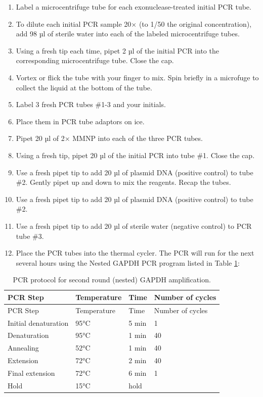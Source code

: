 \documentclass[]{book}
\providecommand{\tightlist}{%
  \setlength{\itemsep}{0pt}\setlength{\parskip}{0pt}}
\theoremstyle{definition}
\theoremstyle{definition}
\theoremstyle{definition}
\theoremstyle{remark}
\begin{document}
\begin{enumerate}
\def\labelenumi{\arabic{enumi}.}
\tightlist
\item
  Label a microcentrifuge tube for each exonuclease-treated initial PCR
  tube.
\item
  To dilute each initial PCR sample 20× (to 1/50 the original
  concentration), add 98 µl of sterile water into each of the labeled
  microcentrifuge tubes.
\item
  Using a fresh tip each time, pipet 2 µl of the initial PCR into the
  corresponding microcentrifuge tube. Close the cap.
\item
  Vortex or flick the tube with your finger to mix. Spin briefly in a
  microfuge to collect the liquid at the bottom of the tube.
\item
  Label 3 fresh PCR tubes \#1-3 and your initials.
\item
  Place them in PCR tube adaptors on ice.
\item
  Pipet 20 µl of 2× MMNP into each of the three PCR tubes.
\item
  Using a fresh tip, pipet 20 µl of the initial PCR into tube \#1. Close
  the cap.
\item
  Use a fresh pipet tip to add 20 µl of plasmid DNA (positive control)
  to tube \#2. Gently pipet up and down to mix the reagents. Recap the
  tubes.
\item
  Use a fresh pipet tip to add 20 µl of plasmid DNA (positive control)
  to tube \#2.
\item
  Use a fresh pipet tip to add 20 µl of sterile water (negative control)
  to PCR tube \#3.
\item
  Place the PCR tubes into the thermal cycler. The PCR will run for the
  next several hours using the Nested GAPDH PCR program listed in Table
  \ref{tab:nestedpcr}:
\end{enumerate}

\begin{longtable}[]{@{}llll@{}}
\caption{\label{tab:nestedpcr} PCR protocol for second round (nested) GAPDH
amplification.}\tabularnewline
\toprule
PCR Step & Temperature & Time & Number of cycles\tabularnewline
\midrule
\endfirsthead
\toprule
PCR Step & Temperature & Time & Number of cycles\tabularnewline
\midrule
\endhead
Initial denaturation & 95°C & 5 min & 1\tabularnewline
Denaturation & 95°C & 1 min & 40\tabularnewline
Annealing & 52°C & 1 min & 40\tabularnewline
Extension & 72°C & 2 min & 40\tabularnewline
Final extension & 72°C & 6 min & 1\tabularnewline
Hold & 15°C & hold &\tabularnewline
\bottomrule
\end{longtable}
\end{document}
